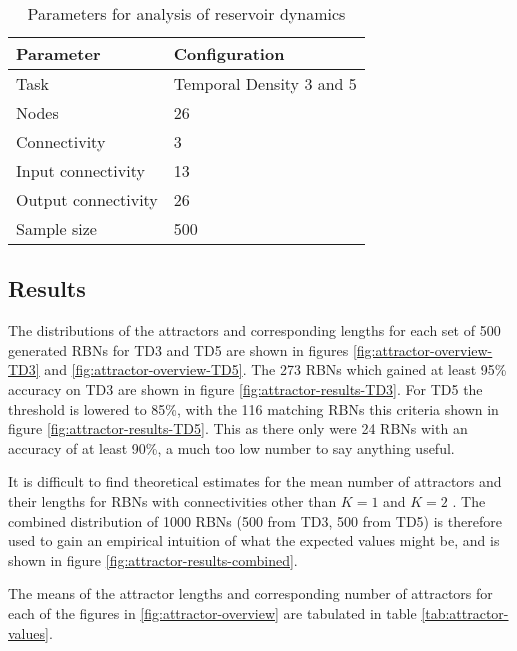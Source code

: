 \begin{table}[h]
    \centering
    \caption{Parameters for analysis of reservoir dynamics}
    \label{tab:reservoir-dynamics-parameters}
    \begin{tabular}{ll}
        \hline
        \textbf{Parameter} & \textbf{Configuration} \\
        \hline
        \hline
        Task                & Temporal Density 3 and 5  \\
        Nodes               & 26                        \\
        Connectivity        & 3                         \\
        Input connectivity  & 13                        \\
        Output connectivity & 26                        \\
        Sample size         & 500 \\
        \hline
    \end{tabular}
\end{table}

\subsection{Results}

The distributions of the attractors and corresponding lengths for each set of 500 generated RBNs for TD3 and TD5 are shown in figures \ref{fig:attractor-overview-TD3} and \ref{fig:attractor-overview-TD5}.
The 273 RBNs which gained at least 95\% accuracy on TD3 are shown in figure \ref{fig:attractor-results-TD3}.
For TD5 the threshold is lowered to 85\%,
with the 116 matching RBNs this criteria shown in figure \ref{fig:attractor-results-TD5}.
This as there only were 24 RBNs with an accuracy of at least 90\%,
a much too low number to say anything useful.

It is difficult to find theoretical estimates for the mean number of attractors and their lengths for RBNs with connectivities other than $ K = 1 $ \cite{drossel2005number} and $ K = 2 $ \cite{samuelsson2003superpolynomial}.
The combined distribution of 1000 RBNs (500 from TD3, 500 from TD5) is therefore used to gain an empirical intuition of what the expected values might be,
and is shown in figure \ref{fig:attractor-results-combined}.

The means of the attractor lengths and corresponding number of attractors for each of the figures in \ref{fig:attractor-overview} are tabulated in table \ref{tab:attractor-values}.

